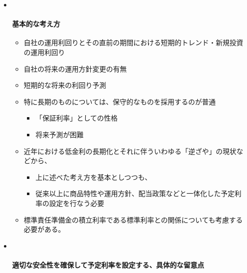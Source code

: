 \documentclass[
]{article}
\providecommand{\tightlist}{%
  \setlength{\itemsep}{0pt}\setlength{\parskip}{0pt}}
\begin{document}
\begin{itemize}
\item ~
  \hypertarget{ux57faux672cux7684ux306aux8003ux3048ux65b9-1}{%
  \paragraph{基本的な考え方}\label{ux57faux672cux7684ux306aux8003ux3048ux65b9-1}}

  \begin{itemize}
  \tightlist
  \item
    自社の運用利回りとその直前の期間における短期的トレンド・新規投資の運用利回り
  \item
    自社の将来の運用方針変更の有無
  \item
    短期的な将来の利回り予測
  \item
    特に長期のものについては、保守的なものを採用するのが普通

    \begin{itemize}
    \tightlist
    \item
      「保証利率」としての性格
    \item
      将来予測が困難
    \end{itemize}
  \item
    近年における低金利の長期化とそれに伴ういわゆる「逆ざや」の現状などから、

    \begin{itemize}
    \tightlist
    \item
      上に述べた考え方を基本としつつも、
    \item
      従来以上に商品特性や運用方針、配当政策などと一体化した予定利率の設定を行なう必要
    \end{itemize}
  \item
    標準責任準備金の積立利率である標準利率との関係についても考慮する必要がある。
  \end{itemize}
\item ~
  \hypertarget{ux9069ux5207ux306aux5b89ux5168ux6027ux3092ux78baux4fddux3057ux3066ux4e88ux5b9aux5229ux7387ux3092ux8a2dux5b9aux3059ux308bux5177ux4f53ux7684ux306aux7559ux610fux70b9}{%
  \paragraph{適切な安全性を確保して予定利率を設定する、具体的な留意点}\label{ux9069ux5207ux306aux5b89ux5168ux6027ux3092ux78baux4fddux3057ux3066ux4e88ux5b9aux5229ux7387ux3092ux8a2dux5b9aux3059ux308bux5177ux4f53ux7684ux306aux7559ux610fux70b9}}


\end{itemize}
\end{document}
